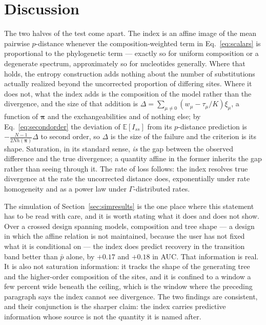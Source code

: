 \documentclass[preprint,12pt,authoryear]{elsarticle}
\newcommand{\Iss}{I_{ss}}
\newcommand{\bpi}{\boldsymbol{\pi}}
\newcommand{\E}{\mathbb{E}}
\theoremstyle{definition}
\theoremstyle{remark}
\begin{document}

\section{Discussion}

The two halves of the test come apart. The index is an affine image of the mean
pairwise $p$-distance whenever the composition-weighted term in
Eq.~\eqref{eq:scalars} is proportional to the phylogenetic term --- exactly so
for uniform composition or a degenerate spectrum, approximately so for
nucleotides generally. Where that holds, the entropy construction adds nothing
about the number of substitutions actually realized beyond the uncorrected
proportion of differing sites. Where it does not, what the index adds is the
composition of the model rather than the divergence, and the size of that
addition is $\Delta=\sum_{\mu\ne0}(w_\mu-\tau_\mu/K)\xi_\mu$, a function of
$\bpi$ and the exchangeabilities and of nothing else; by
Eq.~\eqref{eq:secondorder} the deviation of $\E[\Iss]$ from its $p$-distance
prediction is $-\frac{N-1}{2Nh(\bpi)}\Delta$ to second order, so $\Delta$ is
the size of the failure and the criterion is its shape. Saturation, in its
standard sense, \emph{is} the gap between the
observed difference and the true divergence; a quantity affine in the former
inherits the gap rather than seeing through it. The rate of loss
follows: the index resolves true divergence at the rate the uncorrected
distance does, exponentially under rate homogeneity and as a power law under
$\Gamma$-distributed rates.

The simulation of Section~\ref{sec:simresults} is the one place where this
statement has to be read with care, and it is worth stating what it does and
does not show. Over a crossed design spanning models, composition and tree
shape --- a design in which the affine relation is not maintained, because the
user has not fixed what it is conditional on --- the index does predict
recovery in the transition band better than $\bar p$ alone, by $+0.17$ and
$+0.18$ in AUC. That information is real. It is also not saturation
information: it tracks the shape of the generating tree and the higher-order
composition of the sites, and it is confined to a window a few percent wide
beneath the ceiling, which is the window where the preceding paragraph says the
index cannot see divergence. The two findings are consistent, and their
conjunction is the sharper claim: the index carries predictive information
whose source is not the quantity it is named after.
\end{document}
